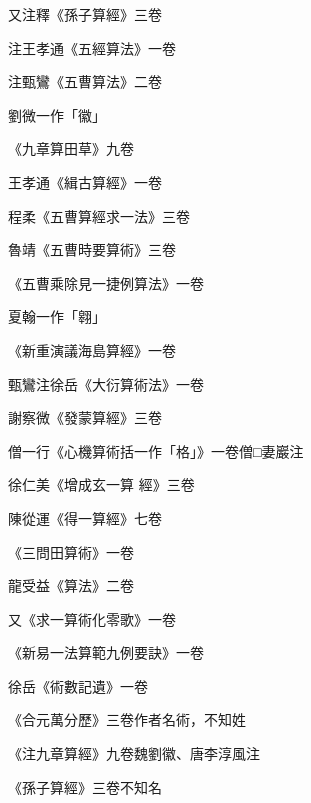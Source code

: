\begin{pinyinscope}
 又注釋《孫子算經》三卷



 注王孝通《五經算法》一卷



 注甄鸞《五曹算法》二卷



 劉微一作「徽」



 《九章算田草》九卷



 王孝通《緝古算經》一卷



 程柔《五曹算經求一法》三卷



 魯靖《五曹時要算術》三卷



 《五曹乘除見一捷例算法》一卷



 夏翰一作「翱」



 《新重演議海島算經》一卷



 甄鸞注徐岳《大衍算術法》一卷



 謝察微《發蒙算經》三卷



 僧一行《心機算術括一作「格」》一卷僧□妻巖注



 徐仁美《增成玄一算
 經》三卷



 陳從運《得一算經》七卷



 《三問田算術》一卷



 龍受益《算法》二卷



 又《求一算術化零歌》一卷



 《新易一法算範九例要訣》一卷



 徐岳《術數記遺》一卷



 《合元萬分歷》三卷作者名術，不知姓



 《注九章算經》九卷魏劉徽、唐李淳風注



 《孫子算經》三卷不知名




\end{pinyinscope}
